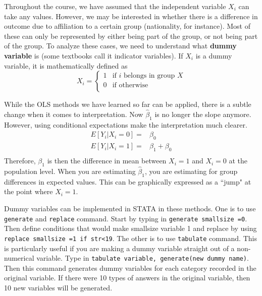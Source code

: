 Throughout the course, we have assumed that the independent variable $X_i$ can take any values. However, we may be interested in whether there is a difference in outcome due to affiliation to a certain group (nationality, for instance). Most of these can only be represented by either being part of the group, or not being part of the group. To analyze these cases, we need to understand what \textbf{dummy variable} is (some textbooks call it indicator variables). If $X_i$ is a dummy variable, it is mathematically defined as
\[
X_i = \begin{cases} 1 & \text{if $i$ belongs in group $X$} \\  0 & \text{if otherwise} \\ \end{cases}
\]
\par\medskip
While the OLS methods we have learned so far can be applied, there is a subtle change when it comes to interpretation. Now $\hat{\beta}_1$ is no longer the slope anymore. However, using conditional expectations make the interpretation much clearer.
\[
\begin{aligned}
E[Y_i |X_i=0]=& \beta_0\\
E[Y_i |X_i=1]=& \beta_1+\beta_0\\
\end{aligned}
\]
Therefore, $\beta_1$ is then the difference in mean between $X_i=1$ and $X_i=0$ at the population level. When you are estimating $\hat{\beta}_1$, you are estimating for group differences in expected values. This can be graphically expressed as a ``jump" at the point where $X_i=1$. \par\medskip
Dummy variables can be implemented in STATA in these methods. One is to use \texttt{generate} and \texttt{replace} command. Start by typing in \texttt{generate smallsize =0}. Then define conditions that would make smallsize variable 1 and replace by using \texttt{replace smallsize =1 if str<19}. The other is to use \texttt{tabulate} command. This is particularly useful if you are making a dummy variable straight out of a non-numerical variable. Type in \texttt{tabulate variable, generate(new dummy name)}. Then this command generates dummy variables for each category recorded in the original variable. If there were 10 types of answers in the original variable, then 10 new variables will be generated. \par\medskip 
